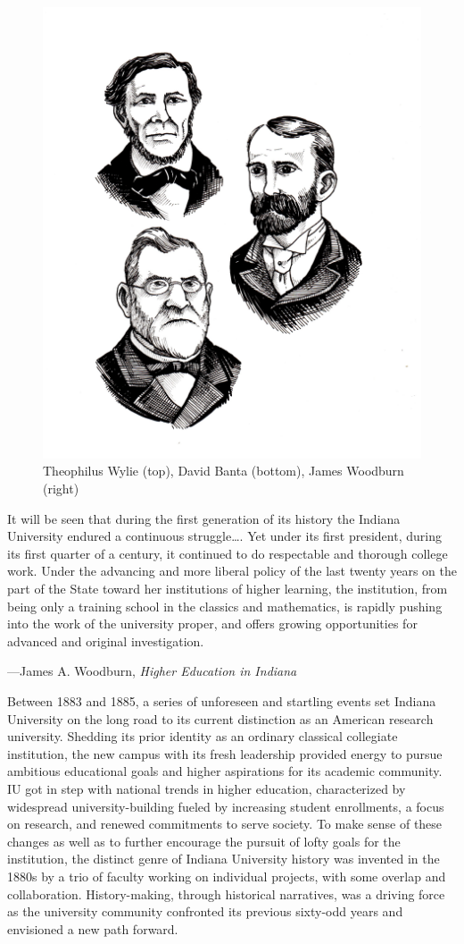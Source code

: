 \documentclass[
  american,
  letterpaper,
]{scrreprt}
\begin{document}
\begin{figure}[H]

{\centering \includegraphics[width=0.6\linewidth,height=\textheight,keepaspectratio]{images/miu3.jpeg}

}

\caption{Theophilus Wylie (top), David Banta (bottom), James Woodburn
(right)}

\end{figure}%

\epigraph{
It will be seen that during the first generation of its history the Indiana University endured a continuous struggle\ldots{}. Yet under its first president, during its first quarter of a century, it continued to do respectable and thorough college work. Under the advancing and more liberal policy of the last twenty years on the part of the State toward her institutions of higher learning, the institution, from being only a training school in the classics and mathematics, is rapidly pushing into the work of the university proper, and offers growing opportunities for advanced and original investigation.}
{---James A. Woodburn, \textit{Higher Education in Indiana}}

Between 1883 and 1885, a series of unforeseen and startling events set
Indiana University on the long road to its current distinction as an
American research university. Shedding its prior identity as an ordinary
classical collegiate institution, the new campus with its fresh
leadership provided energy to pursue ambitious educational goals and
higher aspirations for its academic community. IU got in step with
national trends in higher education, characterized by widespread
university-building fueled by increasing student enrollments, a focus on
research, and renewed commitments to serve society. To make sense of
these changes as well as to further encourage the pursuit of lofty goals
for the institution, the distinct genre of Indiana University history
was invented in the 1880s by a trio of faculty working on individual
projects, with some overlap and collaboration. History-making, through
historical narratives, was a driving force as the university community
confronted its previous sixty-odd years and envisioned a new path
forward.
\end{document}
